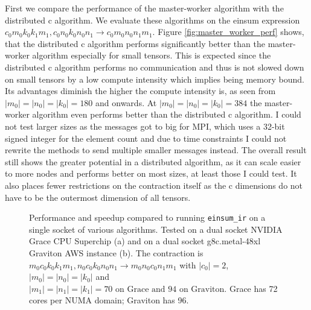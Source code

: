 First we compare the performance of the master-worker algorithm with the distributed c algorithm.
We evaluate these algorithms on the einsum expression $c_0m_0k_0k_1m_1, c_0n_0k_0n_0n_1 \rightarrow c_0m_0n_0n_1m_1$.
Figure \ref{fig:master_worker_perf} shows, that the distributed c algorithm performs significantly better than the master-worker algorithm especially for small tensors.
This is expected since the distributed c algorithm performs no communication and thus is not slowed down on small tensors by a low compute intensity which implies being memory bound.
Its advantages diminish the higher the compute intensity is, as seen from $|m_0|=|n_0|=|k_0|= 180$ and onwards.
At $|m_0|=|n_0|=|k_0|= 384$ the master-worker algorithm even performs better than the distributed c algorithm.
I could not test larger sizes as the messages got to big for MPI, which uses a 32-bit signed integer for the element count and due to time constraints I could not rewrite the methods to send multiple smaller messages instead.
The overall result still shows the greater potential in a distributed algorithm, as it can scale easier to more nodes and performs better on most sizes, at least those I could test.
It also places fewer restrictions on the contraction itself as the c dimensions do not have to be the outermost dimension of all tensors.

\begin{figure}[ht]
  \centering
    \begin{subfigure}[t]{1\textwidth}
      
    \end{subfigure}
  \caption{
    Performance and speedup compared to running \texttt{einsum\_ir} on a single socket of various algorithms.
    Tested on a dual socket NVIDIA Grace CPU Superchip (a) and on a dual socket g8c.metal-48xl Graviton AWS instance (b).
    The contraction is $m_0c_0k_0k_1m_1, n_0c_0k_0n_0n_1 \rightarrow m_0n_0c_0n_1m_1$ with $|c_0|=2$, $|m_0|=|n_0|=|k_0|$ and $|m_1|=|n_1|=|k_1|=70\text{ on Grace and } 94\text{ on Graviton}$.
    Grace has 72 cores per NUMA domain; Graviton has 96.
    }
  \label{fig:einsum_ir_perf}
\end{figure}

